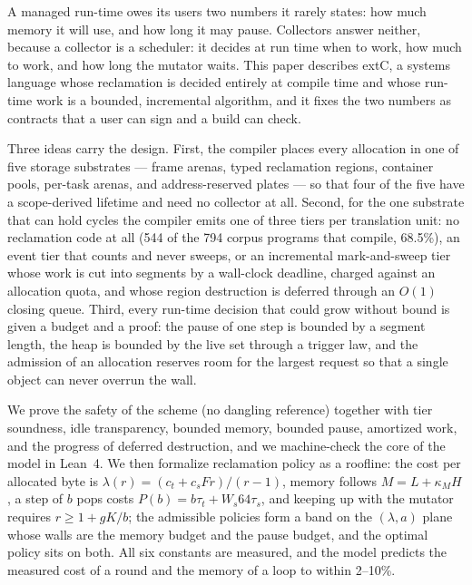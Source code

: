 A managed run-time owes its users two numbers it rarely states: how much memory it will use, and how long it may pause.
Collectors answer neither, because a collector is a scheduler: it decides at run time when to work, how much to work, and how long the mutator waits.
This paper describes extC, a systems language whose reclamation is decided entirely at compile time and whose run-time work is a bounded, incremental algorithm, and it fixes the two numbers as contracts that a user can sign and a build can check.

Three ideas carry the design.
First, the compiler places every allocation in one of five storage substrates --- frame arenas, typed reclamation regions, container pools, per-task arenas, and address-reserved plates --- so that four of the five have a scope-derived lifetime and need no collector at all.
Second, for the one substrate that can hold cycles the compiler emits one of three tiers per translation unit: no reclamation code at all (544 of the 794 corpus programs that compile, 68.5\%), an event tier that counts and never sweeps, or an incremental mark-and-sweep tier whose work is cut into segments by a wall-clock deadline, charged against an allocation quota, and whose region destruction is deferred through an $O(1)$ closing queue.
Third, every run-time decision that could grow without bound is given a budget and a proof: the pause of one step is bounded by a segment length, the heap is bounded by the live set through a trigger law, and the admission of an allocation reserves room for the largest request so that a single object can never overrun the wall.

We prove the safety of the scheme (no dangling reference) together with tier soundness, idle transparency, bounded memory, bounded pause, amortized work, and the progress of deferred destruction, and we machine-check the core of the model in Lean~4.
We then formalize reclamation policy as a roofline: the cost per allocated byte is $\lambda(r) = (c_t + c_s F r)/(r-1)$, memory follows $M = L + \kappa_M H$, a step of $b$ pops costs $P(b) = b\tau_t + W_s 64 \tau_s$, and keeping up with the mutator requires $r \ge 1 + gK/b$; the admissible policies form a band on the $(\lambda, a)$ plane whose walls are the memory budget and the pause budget, and the optimal policy sits on both.
All six constants are measured, and the model predicts the measured cost of a round and the memory of a loop to within 2--10\%.

